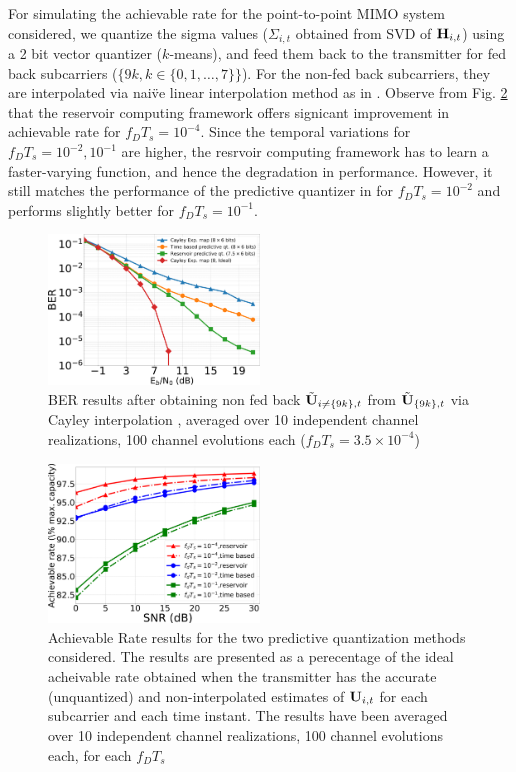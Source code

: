 \documentclass[conference]{IEEEtran}
\begin{document}
For simulating the achievable rate for the point-to-point MIMO system considered, we quantize the sigma values ($\Sigma_{i,t}$ obtained from SVD of ${\bf H}_{i,t}$) using a 2 bit vector quantizer ($k$-means), and feed them back to the transmitter for fed back subcarriers ($\{9k, k \in \{0,1,\ldots,7\}\}$). For the non-fed back subcarriers, they are interpolated via nai\"ve linear interpolation method as in \cite{Gupt1905:Predictive}. Observe from Fig. \ref{achievrate} that the reservoir computing framework offers signicant improvement in achievable rate for $f_DT_s=10^{-4}$. Since the temporal variations for $f_DT_s=10^{-2}, 10^{-1}$ are higher, the resrvoir computing framework has to learn a faster-varying function, and hence the degradation in performance. However, it still matches the performance of the predictive quantizer in \cite{6891198} for $f_DT_s=10^{-2}$ and performs slightly better for $f_DT_s=10^{-1}$.
\begin{figure}[h]
\centering
\includegraphics[width=0.5\textwidth]{images/BER_res.pdf}
\caption{BER results after obtaining non fed back $\tilde{{\bf U}}_{i\neq\{9k\},t}$ from $\tilde{{\bf U}}_{\{9k\},t}$ via Cayley interpolation \cite{Gupt1905:Predictive}, averaged over 10 independent channel realizations, 100 channel evolutions each ($f_DT_s=3.5\times10^{-4}$)}
\label{BER}
\end{figure}

\begin{figure}[h]
\centering
\includegraphics[width=0.5\textwidth]{images/achievRate.pdf}
\caption{Achievable Rate results for the two predictive quantization methods considered. The results are presented as a perecentage of the ideal acheivable rate obtained when the transmitter has the accurate (unquantized) and non-interpolated estimates of ${\bf U}_{i,t}$ for each subcarrier and each time instant. The results have been averaged over 10 independent channel realizations, 100 channel evolutions each, for each $f_DT_s$}
\label{achievrate}
\end{figure}
\end{document}
